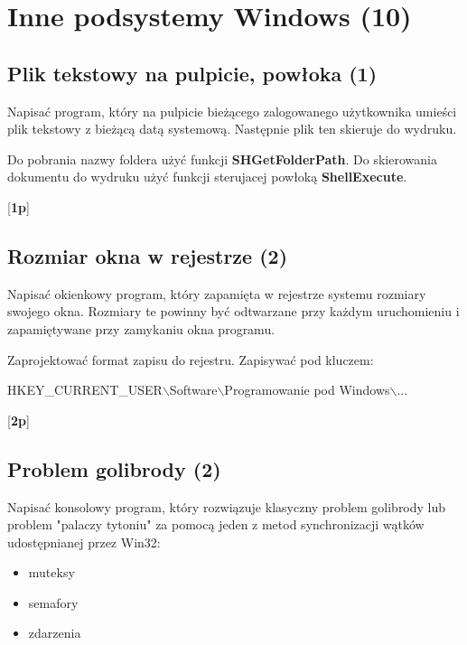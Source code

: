 ﻿\section{Inne podsystemy Windows (10)}

\subsection{Plik tekstowy na pulpicie, powłoka (1)}

      Napisać program, który na pulpicie bieżącego zalogowanego użytkownika umieści
\label{powloka}	  
      plik tekstowy z bieżącą datą systemową. Następnie plik ten skieruje do wydruku.

      Do pobrania nazwy foldera użyć funkcji {\bf SHGetFolderPath}. Do skierowania dokumentu do wydruku
	  użyć funkcji sterujacej powłoką {\bf ShellExecute}.
      
      [{\bf 1p}]

\subsection{Rozmiar okna w rejestrze (2)}

      Napisać okienkowy program, który zapamięta w rejestrze systemu rozmiary swojego okna.
\label{okno_w_rejestrze}	  
      Rozmiary te powinny być odtwarzane przy każdym uruchomieniu i zapamiętywane przy
      zamykaniu okna programu.
      
      Zaprojektować format zapisu do rejestru. Zapisywać pod kluczem:
      
      HKEY\_CURRENT\_USER$\backslash$Software$\backslash$Programowanie pod Windows$\backslash$...	  
	  
      [{\bf 2p}]

\subsection{Problem golibrody (2)}

      Napisać konsolowy program, który rozwiązuje klasyczny problem golibrody lub problem "palaczy tytoniu" 
\label{golibroda}	  
       za pomocą jeden z metod synchronizacji wątków udostępnianej przez Win32:
	   \begin{itemize}
	   \item muteksy
	   \item semafory
	   \item zdarzenia
	   \end{itemize}

